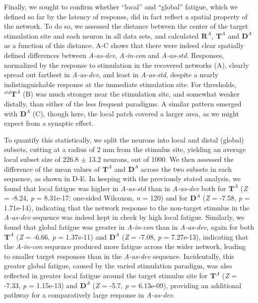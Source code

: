 \documentclass[9pt,lineno,onehalfspacing]{elife}
\newcommand{\dev}{\textit{A-as-dev}}
\newcommand{\msc}{\textit{A-in-con}}
\newcommand{\std}{\textit{A-as-std}}
\newcommand{\R}[3][]{{}^{#1}_{}\boldsymbol R^{#2}_{#3}}
\newcommand{\T}[3][]{{}^{#1}_{}\boldsymbol T^{#2}_{#3}}
\newcommand{\D}[3][]{{}^{#1}_{}\boldsymbol D^{#2}_{#3}}
\begin{document}
Finally, we sought to confirm whether ``local'' and ``global'' fatigue, which we defined so far by the latency of response, did in fact reflect a spatial property of the network. To do so, we assessed the distance between the center of the target stimulation site and each neuron in all data sets, and calculated $\R{A}{}$, $\T{A}{}$ and $\D{A}{}$ as a function of this distance. A-C shows that there were indeed clear spatially defined differences between \dev{}, \msc{} and \std{}. Responses, normalized by the response to stimulation in the recovered networks (A), clearly spread out farthest in \dev{}, and least in \std{}, despite a nearly indistinguishable response at the immediate stimulation site. For thresholds, $\T[std]{A}{}$ (B) was much stronger near the stimulation site, and somewhat weaker distally, than either of the less frequent paradigms. A similar pattern emerged with $\D{A}{}$ (C), though here, the local patch covered a larger area, as we might expect from a synaptic effect.

To quantify this statistically, we split the neurons into local and distal (global) subsets, cutting at a radius of 2 mm from the stimulus site, yielding an average local subset size of 226.8 $\pm$ 13.2 neurons, out of 1000. We then assessed the difference of the mean values of $\T{A}{}$ and $\D{A}{}$ across the two subsets in each sequence, as shown in D-E. In keeping with the previously stated analysis, we found that local fatigue was higher in \std{} than in \dev{} both for $\T{A}{}$ (\textit{Z} = -8.24, \textit{p} = 8.31e-17; one-sided Wilcoxon, \textit{n} = 120) and for $\D{A}{}$ (\textit{Z} = -7.58, \textit{p} = 1.71e-14), indicating that the network response to the non-target stimulus in the \dev{} sequence was indeed kept in check by high local fatigue. Similarly, we found that global fatigue was greater in \msc{} than in \dev{}, again for both $\T{A}{}$ (\textit{Z} = -6.66, \textit{p} = 1.37e-11) and $\D{A}{}$ (\textit{Z} = -7.08, \textit{p} = 7.27e-13), indicating that the \msc{} sequence produced more fatigue across the wider network, leading to smaller target responses than in the \dev{} sequence. Incidentally, this greater global fatigue, caused by the varied stimulation paradigm, was also reflected in greater local fatigue around the target stimulus site for $\T{A}{}$ (\textit{Z} = -7.33, \textit{p} = 1.15e-13) and $\D{A}{}$ (\textit{Z} = -5.7, \textit{p} = 6.13e-09), providing an additional pathway for a comparatively large response in \dev{}.
\end{document}
